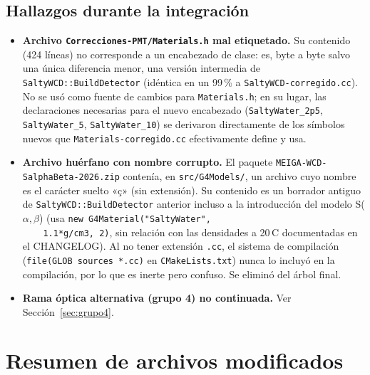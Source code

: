 \documentclass[11pt,a4paper]{article}
\newcommand{\codigo}[1]{\nolinkurl{#1}}
\begin{document}
\subsection{Hallazgos durante la integración}
\label{sec:hallazgos}

\begin{itemize}
  \item \textbf{Archivo \codigo{Correcciones-PMT/Materials.h} mal
    etiquetado.} Su contenido (424 líneas) no corresponde a un encabezado
    de clase: es, byte a byte salvo una única diferencia menor, una
    versión intermedia de \codigo{SaltyWCD::BuildDetector} (idéntica en
    un 99\,\% a \codigo{SaltyWCD-corregido.cc}). No se usó como fuente de
    cambios para \codigo{Materials.h}; en su lugar, las declaraciones
    necesarias para el nuevo encabezado (\codigo{SaltyWater\_2p5},
    \codigo{SaltyWater\_5}, \codigo{SaltyWater\_10}) se derivaron
    directamente de los símbolos nuevos que \codigo{Materials-corregido.cc}
    efectivamente define y usa.
  \item \textbf{Archivo huérfano con nombre corrupto.} El paquete
    \codigo{MEIGA-WCD-SalphaBeta-2026.zip} contenía, en
    \codigo{src/G4Models/}, un archivo cuyo nombre es el carácter suelto
    «ç» (sin extensión). Su contenido es un borrador antiguo de
    \codigo{SaltyWCD::BuildDetector} anterior incluso a la introducción del
    modelo S($\alpha,\beta$) (usa \codigo{new G4Material("SaltyWater",
    1.1*g/cm3, 2)}, sin relación con las densidades a 20\,\textdegree C
    documentadas en el CHANGELOG). Al no tener extensión \codigo{.cc}, el
    sistema de compilación (\codigo{file(GLOB sources *.cc)} en
    \codigo{CMakeLists.txt}) nunca lo incluyó en la compilación, por lo
    que es inerte pero confuso. Se eliminó del árbol final.
  \item \textbf{Rama óptica alternativa (grupo 4) no continuada.} Ver
    Sección~\ref{sec:grupo4}.
\end{itemize}

\section{Resumen de archivos modificados}
\end{document}
